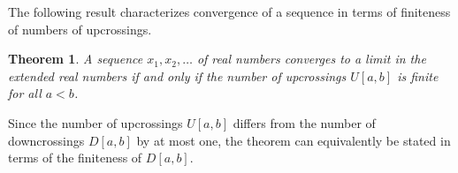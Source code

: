 \documentclass[12pt]{article}
\newtheorem*{theorem*}{Theorem}
\begin{document}

The following result characterizes convergence of a sequence in terms of finiteness of numbers of upcrossings.

\begin{theorem*}
A sequence $x_1,x_2,\ldots$ of real numbers converges to a limit in the extended real numbers if and only if the number of upcrossings $U[a,b]$ is finite for all $a<b$. 
\end{theorem*}

Since the number of upcrossings $U[a,b]$ differs from the number of downcrossings $D[a,b]$ by at most one, the theorem can equivalently be stated in terms of the finiteness of $D[a,b]$.

\end{document}
